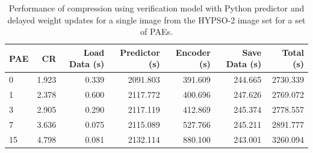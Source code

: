 \begin{table}[ht]
	\caption{Performance of compression using verification model with Python predictor and delayed weight updates for a single image from the HYPSO-2 image set for a set of PAEs.}
	\label{tab:coastline-compress-py}
	\begin{center}
		\begin{tabular}{lrrrrrr}
			\hline
			\textbf{PAE} & \textbf{CR} & \textbf{Load Data (s)} & \textbf{Predictor (s)} & \textbf{Encoder (s)} & \textbf{Save Data (s)} & \textbf{Total (s)} \\
			\hline
			0            & 1.923       & 0.339                  & 2091.803               & 391.609              & 244.665                & 2730.339           \\
			1            & 2.378       & 0.600                  & 2117.772               & 400.696              & 247.626                & 2769.072           \\
			3            & 2.905       & 0.290                  & 2117.119               & 412.869              & 245.374                & 2778.557           \\
			7            & 3.636       & 0.075                  & 2115.089               & 527.766              & 245.211                & 2891.777           \\
			15           & 4.798       & 0.081                  & 2132.114               & 880.100              & 243.001                & 3260.094           \\
			\hline
		\end{tabular}
	\end{center}
\end{table}

